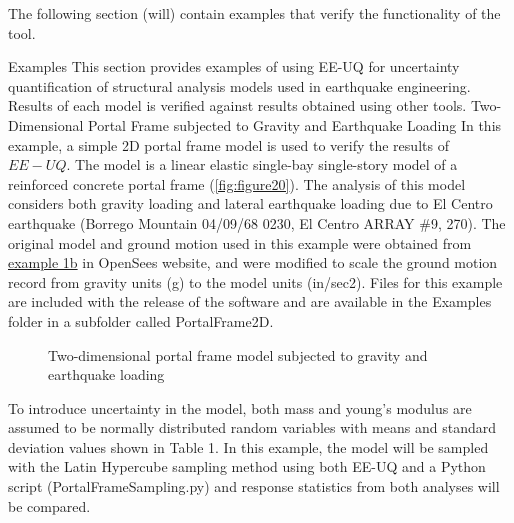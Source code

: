The following section (will) contain examples that verify the functionality of the tool.

Examples
This section provides examples of using EE-UQ for uncertainty quantification of structural analysis models used in earthquake engineering. 
Results of each model is verified against results obtained using other tools.
Two-Dimensional Portal Frame subjected to Gravity and Earthquake Loading
In this example, a simple 2D portal frame model is used to verify the results of $EE-UQ$. 
The model is a linear elastic single-bay single-story model of a reinforced concrete portal frame (\autoref{fig:figure20}). 
The analysis of this model considers both gravity loading and lateral earthquake loading due to El Centro earthquake 
(Borrego Mountain 04/09/68 0230, El Centro ARRAY \#9, 270). 
The original model and ground motion used in this example were obtained from 
\href{http://opensees.berkeley.edu/wiki/index.php/OpenSees_Example_1b._Elastic_Portal_Frame}{example 1b} in OpenSees website, 
and were modified to scale the ground motion record from gravity units (g) to the model units (in/sec2). 
Files for this example are included with the release of the software and are available in the Examples folder in a subfolder called PortalFrame2D.


\begin{figure}[!htbp]
  \caption{Two-dimensional portal frame model subjected to gravity and earthquake loading}
  \label{fig:figure20}
\end{figure}

To introduce uncertainty in the model, both mass and young’s modulus are assumed to be normally distributed random variables with means and 
standard deviation values shown in Table 1. In this example, the model will be sampled with the Latin Hypercube sampling method using both 
EE-UQ and a Python script (PortalFrameSampling.py) and response statistics from both analyses will be compared.


